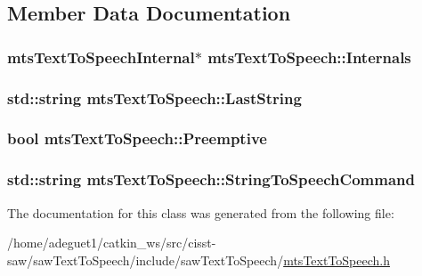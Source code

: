 \subsection{Member Data Documentation}
\hypertarget{classmts_text_to_speech_a3ef89e41ddb760539b723b6c46f1b463}{
\subsubsection[{Internals}]{\setlength{\rightskip}{0pt plus 5cm}mts\-Text\-To\-Speech\-Internal$\ast$ mts\-Text\-To\-Speech\-::\-Internals\hspace{0.3cm}{\ttfamily [protected]}}}\label{classmts_text_to_speech_a3ef89e41ddb760539b723b6c46f1b463}
\hypertarget{classmts_text_to_speech_a8b6a91cf728698b9bd49ac8d888bbc48}{
\subsubsection[{Last\-String}]{\setlength{\rightskip}{0pt plus 5cm}std\-::string mts\-Text\-To\-Speech\-::\-Last\-String\hspace{0.3cm}{\ttfamily [protected]}}}\label{classmts_text_to_speech_a8b6a91cf728698b9bd49ac8d888bbc48}
\hypertarget{classmts_text_to_speech_a78a3e0004193dbd080e027c3b7a97fa8}{
\subsubsection[{Preemptive}]{\setlength{\rightskip}{0pt plus 5cm}bool mts\-Text\-To\-Speech\-::\-Preemptive\hspace{0.3cm}{\ttfamily [protected]}}}\label{classmts_text_to_speech_a78a3e0004193dbd080e027c3b7a97fa8}
\hypertarget{classmts_text_to_speech_aadd1b9d1f241afe95b2f2b7fa34422a8}{
\subsubsection[{String\-To\-Speech\-Command}]{\setlength{\rightskip}{0pt plus 5cm}std\-::string mts\-Text\-To\-Speech\-::\-String\-To\-Speech\-Command\hspace{0.3cm}{\ttfamily [protected]}}}\label{classmts_text_to_speech_aadd1b9d1f241afe95b2f2b7fa34422a8}


The documentation for this class was generated from the following file\-:\begin{DoxyCompactItemize}
\item 
/home/adeguet1/catkin\-\_\-ws/src/cisst-\/saw/saw\-Text\-To\-Speech/include/saw\-Text\-To\-Speech/\hyperlink{mts_text_to_speech_8h}{mts\-Text\-To\-Speech.\-h}\end{DoxyCompactItemize}
